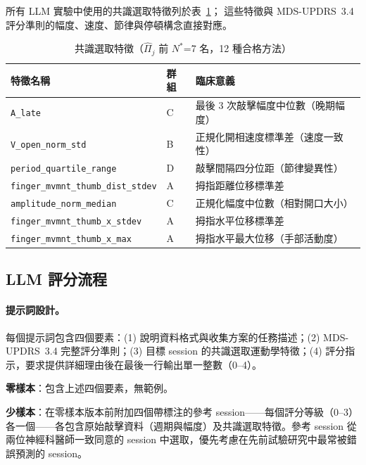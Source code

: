 \documentclass[12pt, a4paper]{article}
\begin{document}
所有 LLM 實驗中使用的共識選取特徵列於表~\ref{tab:selected_features}；
這些特徵與 MDS-UPDRS~3.4 評分準則的幅度、速度、節律與停頓構念直接對應。

\begin{table}[htbp]
    \centering
    \caption{共識選取特徵（$\hat{\Pi}_j$ 前 $N^{*}$=7 名，12 種合格方法）}
    \label{tab:selected_features}
    \renewcommand{\arraystretch}{1.2}
    \begin{tabular}{lll}
        \toprule
        \textbf{特徵名稱} & \textbf{群組} & \textbf{臨床意義} \\
        \midrule
        \texttt{A\_late}                           & C & 最後 3 次敲擊幅度中位數（晚期幅度） \\
        \texttt{V\_open\_norm\_std}                & B & 正規化開相速度標準差（速度一致性） \\
        \texttt{period\_quartile\_range}           & D & 敲擊間隔四分位距（節律變異性） \\
        \texttt{finger\_mvmnt\_thumb\_dist\_stdev} & A & 拇指距離位移標準差 \\
        \texttt{amplitude\_norm\_median}           & C & 正規化幅度中位數（相對開口大小） \\
        \texttt{finger\_mvmnt\_thumb\_x\_stdev}    & A & 拇指水平位移標準差 \\
        \texttt{finger\_mvmnt\_thumb\_x\_max}      & A & 拇指水平最大位移（手部活動度） \\
        \bottomrule
    \end{tabular}
\end{table}

\subsection{LLM 評分流程}

\paragraph{提示詞設計。}
每個提示詞包含四個要素：(1) 說明資料格式與收集方案的任務描述；(2) MDS-UPDRS~3.4 完整評分準則；(3) 目標 session 的共識選取運動學特徵；(4) 評分指示，要求提供詳細理由後在最後一行輸出單一整數（0--4）。

\noindent\textbf{零樣本}：包含上述四個要素，無範例。

\noindent\textbf{少樣本}：在零樣本版本前附加四個帶標注的參考 session——每個評分等級（0--3）各一個——各包含原始敲擊資料（週期與幅度）及共識選取特徵。參考 session 從兩位神經科醫師一致同意的 session 中選取，優先考慮在先前試驗研究中最常被錯誤預測的 session。
\end{document}
